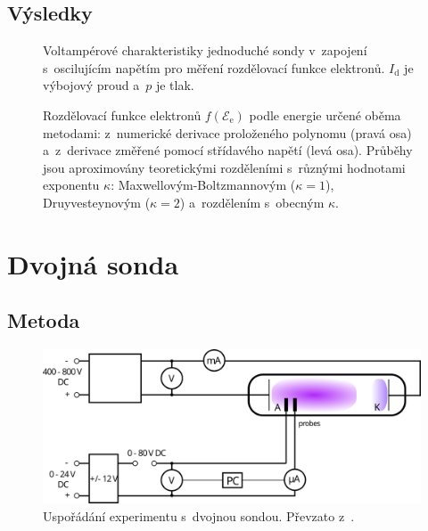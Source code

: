 \documentclass{protokol}
\newcommand\pres{p}
\newcommand\idisch{I_\mathrm{d}}
\newcommand\enelec{\mathcal E_\mathrm{e}}
\newcommand\eedf{f(\enelec)}
\begin{document}
\subsection{Výsledky}
\label{sec:results-eedf}

\begin{figure}[p]
	\centering
	
	
	\par\smallskip
	
	
	\par\smallskip
	
	
	\caption{Voltampérové charakteristiky jednoduché sondy
		v~zapojení s~oscilujícím napětím
		pro měření rozdělovací funkce elektronů.
		$\idisch$ je výbojový proud a~$\pres$ je tlak.}
	\label{fig:simple2-vac}
\end{figure}

\begin{figure}[p]
	\centering
	
	\par\smallskip
	
	\par\smallskip
	
	\caption{Rozdělovací funkce elektronů $\eedf$ podle energie určené
		oběma metodami: z~numerické derivace proloženého polynomu (pravá osa)
		a~z~derivace změřené pomocí střídavého napětí (levá osa).
		Průběhy jsou aproximovány teoretickými rozděleními s~různými hodnotami
		exponentu $\kappa$:
		Max\-wellovým-Boltzmannovým ($\kappa = 1$),
		Druyvesteynovým ($\kappa = 2$)
		a~rozdělením s~obecným $\kappa$.}
	\label{fig:eedf}
\end{figure}

\clearpage
\section{Dvojná sonda}
\label{sec:double}

\subsection{Metoda}
\label{sec:method-double}

\begin{figure}[hbp]
	\centering
	\includegraphics{diagram-double.png}
	\caption{Uspořádání experimentu s~dvojnou sondou.
		Převzato z~\autocite{assignment-doubleprobe}.}
	\label{fig:diagram-double}
\end{figure}
\end{document}
